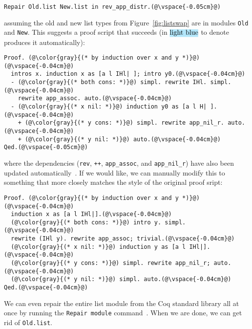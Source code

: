 \begin{lstlisting}
Repair Old.list New.list in rev_app_distr.(@\vspace{-0.05cm}@)
\end{lstlisting}
assuming the old and new list types from Figure~\ref{fig:listswap} are in modules \lstinline{Old} and \lstinline{New}.
This suggests a proof script that succeeds (in $\codeauto{light blue}$ to denote \toolname produces it automatically):

\begin{lstlisting}[backgroundcolor=\color{cyan!30}]
Proof. (@\color{gray}{(* by induction over x and y *)}@)(@\vspace{-0.04cm}@)
  intros x. induction x as [a l IHl| ]; intro y0.(@\vspace{-0.04cm}@)
  - (@\color{gray}{(* both cons: *)}@) simpl. rewrite IHl. simpl.(@\vspace{-0.04cm}@)
    rewrite app_assoc. auto.(@\vspace{-0.04cm}@)
  - (@\color{gray}{(* x nil: *)}@) induction y0 as [a l H| ].(@\vspace{-0.04cm}@)
    + (@\color{gray}{(* y cons: *)}@) simpl. rewrite app_nil_r. auto.(@\vspace{-0.04cm}@)
    + (@\color{gray}{(* y nil: *)}@) auto.(@\vspace{-0.04cm}@)
Qed.(@\vspace{-0.05cm}@)
\end{lstlisting}
where the dependencies (\lstinline{rev}, \lstinline{++}, \lstinline{app_assoc}, and \lstinline{app_nil_r}) have
also been updated automatically~\href{https://github.com/uwplse/pumpkin-pi/blob/silent/plugin/coq/Swap.v}{}. %
If we would like, we can manually modify this to something that more closely matches the style of the original proof sript:

\begin{lstlisting}
Proof. (@\color{gray}{(* by induction over x and y *)}@)(@\vspace{-0.04cm}@)
  induction x as [a l IHl|].(@\vspace{-0.04cm}@)
  (@\color{gray}{(* both cons: *)}@) intro y. simpl.(@\vspace{-0.04cm}@)
  rewrite (IHl y). rewrite app_assoc; trivial.(@\vspace{-0.04cm}@)
  (@\color{gray}{(* x nil: *)}@) induction y as [a l IHl|].(@\vspace{-0.04cm}@)
  (@\color{gray}{(* y cons: *)}@) simpl. rewrite app_nil_r; auto.(@\vspace{-0.04cm}@)
  (@\color{gray}{(* y nil: *)}@) simpl. auto.(@\vspace{-0.04cm}@)
Qed.(@\vspace{-0.04cm}@)
\end{lstlisting}
We can even repair the entire list module from the Coq standard library all at once by running the \lstinline{Repair module}
command~\href{https://github.com/uwplse/pumpkin-pi/blob/silent/plugin/coq/Swap.v}{}. %
When we are done, we can get rid of \lstinline{Old.list}. %

